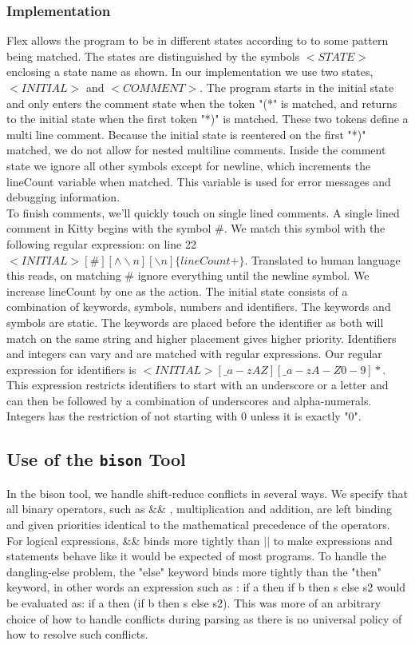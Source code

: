 \documentclass{article}
\begin{document}
\subsubsection*{Implementation}

Flex allows the program to be in different states according to to some pattern being matched.
The states are distinguished by the symbols $<STATE>$ enclosing a state name as shown.   
In our implementation we use two states, $<INITIAL>$ and $<COMMENT>$. The program starts in 
the initial state and only enters the comment state when the token "(*" is matched, and returns to the initial state when the first token "*)" is matched. These two tokens define a multi line comment. Because the initial state is reentered on the first "*)" matched, we do not allow for nested multiline comments. Inside the comment state we ignore all other symbols except for newline, which increments the lineCount variable when matched. This variable is used for error messages and debugging information.\\
To finish comments, we'll quickly touch on single lined comments. A single lined comment in Kitty begins with the symbol \#. We match this symbol with the following regular expression: 
on line 22 $<INITIAL>[\#][\wedge \backslash n][\backslash n]  \{lineCount +\}$. Translated to human language this reads, on matching \# ignore everything until the newline symbol. We increase lineCount by one as the action. The initial state consists of a combination of keywords, symbols, numbers and identifiers. The keywords and symbols are static. The keywords are placed before the identifier as both will match on the same string and higher placement gives higher priority. 
Identifiers and integers can vary and are matched with regular expressions. Our regular expression for identifiers is $<INITIAL>[\_a-zAZ][\_a-zA-Z0-9]*$. This expression restricts identifiers to start with an underscore or a letter and can then be followed by a combination of underscores and alpha-numerals. Integers has the restriction of not starting with 0 unless it is exactly "0".

\subsection{Use of the {\tt bison} Tool}

In the bison tool, we handle shift-reduce conflicts in several ways. We specify that all binary operators, such as \&\& , multiplication and addition, are left binding and given priorities identical to the mathematical precedence of the operators. For logical expressions, \&\& binds more tightly than $|| $ to make expressions and statements behave like it would be expected of most programs. To handle the dangling-else problem, the "else" keyword binds more tightly than the "then" keyword, in other words an expression such as : if a then if b then s else s2 would be evaluated as: if a then (if b then s else s2). This was more of an arbitrary choice of how to handle conflicts during parsing as there is no universal policy of how to resolve such conflicts.
\end{document}
